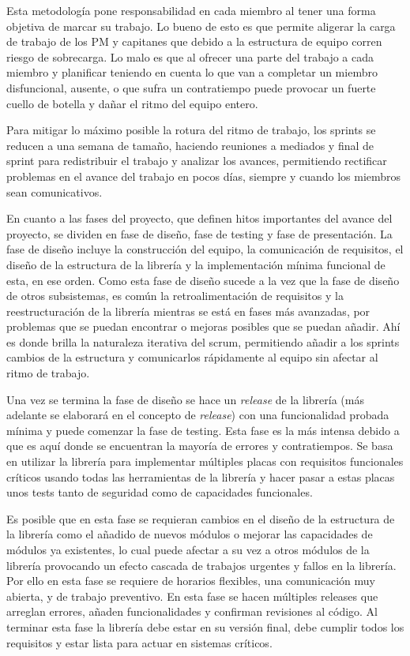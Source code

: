 \documentclass{report}
\begin{document}
Esta metodología pone responsabilidad en cada miembro al tener una forma objetiva de marcar su trabajo. Lo bueno de esto es que permite aligerar la carga de trabajo de los PM y capitanes que debido a la estructura de equipo corren riesgo de sobrecarga. Lo malo es que al ofrecer una parte del trabajo a cada miembro y planificar teniendo en cuenta lo que van a completar un miembro disfuncional, ausente, o que sufra un contratiempo puede provocar un fuerte cuello de botella y dañar el ritmo del equipo entero. \par
Para mitigar lo máximo posible la rotura del ritmo de trabajo, los sprints se reducen a una semana de tamaño, haciendo reuniones a mediados y final de sprint para redistribuir el trabajo y analizar los avances, permitiendo rectificar problemas en el avance del trabajo en pocos días, siempre y cuando los miembros sean comunicativos.
\par \vspace{0.3 cm}
En cuanto a las fases del proyecto, que definen hitos importantes del avance del proyecto, se dividen en fase de diseño, fase de testing y fase de presentación. La fase de diseño incluye la construcción del equipo, la comunicación de requisitos, el diseño de la estructura de la librería y la implementación mínima funcional de esta, en ese orden. Como esta fase de diseño sucede a la vez que la fase de diseño de otros subsistemas, es común la retroalimentación de requisitos y la reestructuración de la librería mientras se está en fases más avanzadas, por problemas que se puedan encontrar o mejoras posibles que se puedan añadir. Ahí es donde brilla la naturaleza iterativa del scrum, permitiendo añadir a los sprints cambios de la estructura y comunicarlos rápidamente al equipo sin afectar al ritmo de trabajo. \par \vspace{0.3 cm} 
Una vez se termina la fase de diseño se hace un \textit{release} de la librería (más adelante se elaborará en el concepto de \textit{release}) con una funcionalidad probada mínima y puede comenzar la fase de testing. Esta fase es la más intensa debido a que es aquí donde se encuentran la mayoría de errores y contratiempos. Se basa en utilizar la librería para implementar múltiples placas con requisitos funcionales críticos usando todas las herramientas de la librería y hacer pasar a estas placas unos tests tanto de seguridad como de capacidades funcionales. \par
Es posible que en esta fase se requieran cambios en el diseño de la estructura de la librería como el añadido de nuevos módulos o mejorar las capacidades de módulos ya existentes, lo cual puede afectar a su vez a otros módulos de la librería provocando un efecto cascada de trabajos urgentes y fallos en la librería. Por ello en esta fase se requiere de horarios flexibles, una comunicación muy abierta, y de trabajo preventivo. En esta fase se hacen múltiples releases que arreglan errores, añaden funcionalidades y confirman revisiones al código. Al terminar esta fase la librería debe estar en su versión final, debe cumplir todos los requisitos y estar lista para actuar en sistemas críticos. \par \vspace{0.3 cm}
\end{document}

